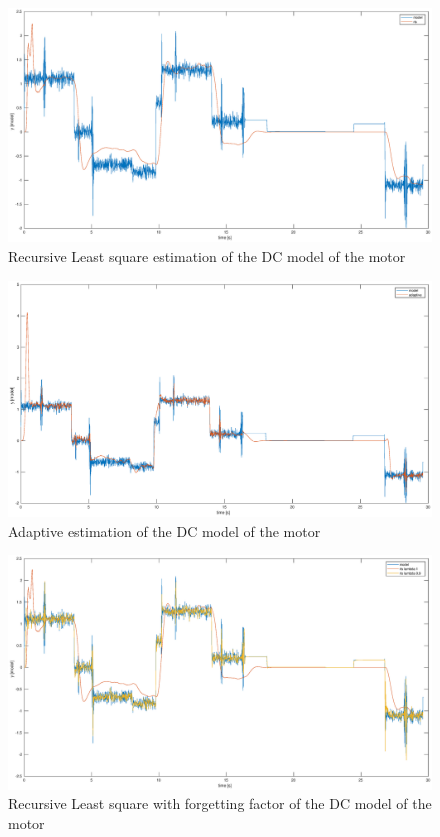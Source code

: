 \documentclass[a4paper,12pt]{article}
\begin{document}
\begin{figure}[H]
    \begin{center}
        \includegraphics[scale=0.3]{images/rls.eps}
    \end{center}
    \caption{Recursive Least square estimation of the DC model of the motor}
    \label{fig:rls}
\end{figure}

\begin{figure}[H]
    \begin{center}
        \includegraphics[scale=0.3]{images/adaptive.eps}
    \end{center}
    \caption{Adaptive estimation of the DC model of the motor}
    \label{fig:adaptive}
\end{figure}

\begin{figure}[H]
    \begin{center}
        \includegraphics[scale=0.3]{images/rls_forget.eps}
    \end{center}
    \caption{Recursive Least square with forgetting factor of the DC model of the motor}
    \label{fig:rls_f}
\end{figure}
\end{document}
